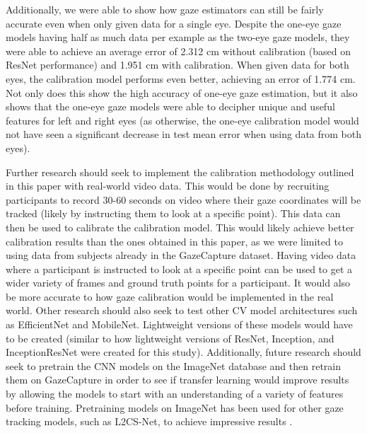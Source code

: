 \documentclass{article}
\begin{document}
Additionally, we were able to show how gaze estimators can still be fairly accurate even when only given data for a single eye. Despite the one-eye gaze models having half as much data per example as the two-eye gaze models, they were able to achieve an average error of 2.312 cm without calibration (based on ResNet performance) and 1.951 cm with calibration. When given data for both eyes, the calibration model performs even better, achieving an error of 1.774 cm. Not only does this show the high accuracy of one-eye gaze estimation, but it also shows that the one-eye gaze models were able to decipher unique and useful features for left and right eyes (as otherwise, the one-eye calibration model would not have seen a significant decrease in test mean error when using data from both eyes).

Further research should seek to implement the calibration methodology outlined in this paper with real-world video data. This would be done by recruiting participants to record 30-60 seconds on video where their gaze coordinates will be tracked (likely by instructing them to look at a specific point). This data can then be used to calibrate the calibration model. This would likely achieve better calibration results than the ones obtained in this paper, as we were limited to using data from subjects already in the GazeCapture dataset. Having video data where a participant is instructed to look at a specific point can be used to get a wider variety of frames and ground truth points for a participant. It would also be more accurate to how gaze calibration would be implemented in the real world. Other research should also seek to test other CV model architectures such as EfficientNet and MobileNet. Lightweight versions of these models would have to be created (similar to how lightweight versions of ResNet, Inception, and InceptionResNet were created for this study). Additionally, future research should seek to pretrain the CNN models on the ImageNet database and then retrain them on GazeCapture in order to see if transfer learning would improve results by allowing the models to start with an understanding of a variety of features before training. Pretraining models on ImageNet has been used for other gaze tracking models, such as L2CS-Net, to achieve impressive results \cite{l2csnet}.
\end{document}
